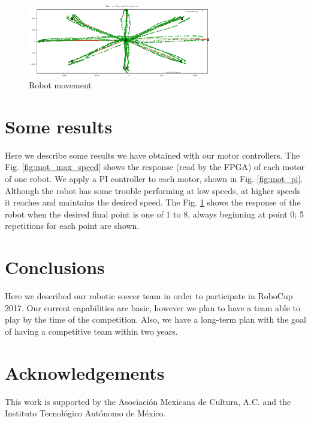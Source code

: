 \documentclass[]{llncs}
\newcommand{\TODO}[1]{{\textcolor{blue}{ToDo: {#1}}}}
\begin{document}
\begin{figure}[htb]
	\centering
	\includegraphics[width=8cm]{./pictures/data_10reps.eps}
	\caption{Robot movement}
	\label{fig:robot_mov}  
\end{figure}
\section{Some results}
Here we describe some results we have obtained with our motor controllers. The Fig. \ref{fig:mot_max_speed} shows the response (read by the FPGA) of each motor of one robot. We apply a PI controller to each motor, shown in Fig. \ref{fig:mot_pi}. Although the robot has some trouble performing at low speeds, at higher speeds it reaches and maintains the desired speed. The Fig. \ref{fig:robot_mov} shows the response of the robot when the desired final point is one of 1 to 8, always beginning at point 0; 5 repetitions for each point are shown.





\section{Conclusions}

Here we described our robotic soccer team in order to participate in RoboCup 2017. Our current capabilities are basic, however we plan to have a team able to play by the time of the competition. Also, we have a long-term plan with the goal of having a competitive team within two years. 



\section{Acknowledgements}
This work is supported by the Asociación Mexicana de Cultura, A.C. and the Instituto Tecnológico Autónomo de México.



\end{document}
